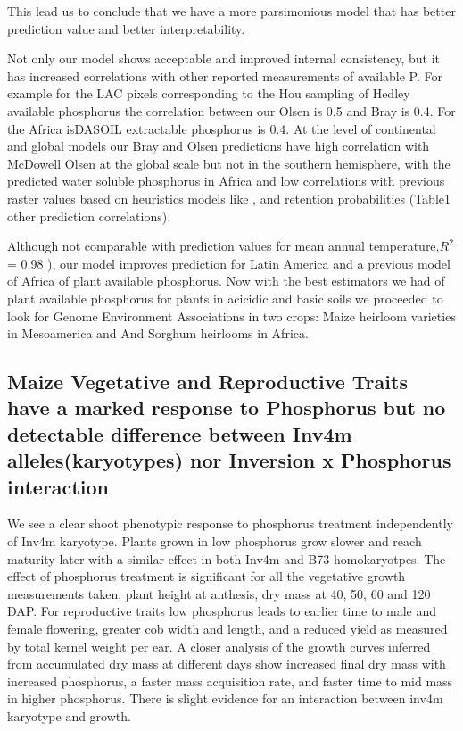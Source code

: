 This lead us to conclude that we have a more parsimonious model that has better prediction value and better interpretability.

Not only our model shows acceptable and improved internal consistency, but it has increased correlations with other reported measurements of available P. For example for the LAC pixels corresponding to the Hou sampling of Hedley available phosphorus the correlation between our Olsen is 0.5  and Bray is 0.4. For the Africa isDASOIL \citep{miller2021b} extractable phosphorus is 0.4.
At the level of continental and global models our Bray and Olsen predictions have high correlation with McDowell Olsen at the global scale but not in the southern hemisphere, with the predicted water soluble phosphorus in Africa \citep{miller2021b,hengl2017a}and low correlations with previous raster values based on heuristics models like \cite{shangguan2014}, \cite{yang2013} and\cite{batjes2011} retention probabilities (Table1 other prediction correlations).

Although not comparable with prediction values for mean annual temperature,$R^2$ = 0.98 \citep{fick2017}), our model improves prediction for Latin America \cite{mcdowell2023} and a previous model of Africa \citep{hengl2017a} of plant available phosphorus.
Now with the best estimators we had of plant available phosphorus for plants in acicidic and basic soils we proceeded to look for Genome Environment Associations in two crops: Maize heirloom varieties in Mesoamerica and And Sorghum heirlooms in Africa.


\subsection{Maize Vegetative and Reproductive Traits have a marked response to Phosphorus but no detectable difference between Inv4m alleles(karyotypes) nor  Inversion x Phosphorus interaction}

We see a clear shoot phenotypic response to phosphorus treatment independently of Inv4m karyotype. 
Plants grown in low phosphorus grow slower and reach maturity later with a similar effect in both Inv4m and B73 homokaryotpes. 
The effect of phosphorus treatment is significant for all the vegetative growth measurements taken, plant height at anthesis, dry mass at 40, 50, 60 and 120 DAP.  
For reproductive traits low phosphorus leads to earlier time to male and female flowering, greater cob width and length, and a reduced yield as measured by total kernel weight per ear.
A closer analysis of the growth curves inferred from accumulated dry mass at different days show increased final dry mass  with increased phosphorus, a faster mass acquisition rate, and faster time to mid mass in higher phosphorus. 
There is slight evidence for an interaction between inv4m karyotype and growth. 

